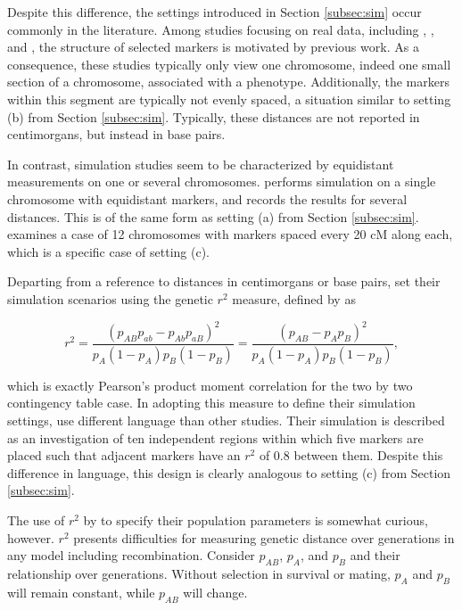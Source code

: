 \documentclass{article}
\begin{document}
Despite this difference, the settings introduced in Section \ref{subsec:sim} occur commonly in the literature. Among studies focusing on real data, including \cite{Galwey2009}, \cite{nyholt2004}, and \cite{Salyakina2005}, the structure of selected markers is motivated by previous work. As a consequence, these studies typically only view one chromosome, indeed one small section of a chromosome, associated with a phenotype. Additionally, the markers within this segment are typically not evenly spaced, a situation similar to setting (b) from Section \ref{subsec:sim}. Typically, these distances are not reported in centimorgans, but instead in base pairs.

In contrast, simulation studies seem to be characterized by equidistant measurements on one or several chromosomes. \cite{cheverud2001} performs simulation on a single chromosome with equidistant markers, and records the results for several distances. This is of the same form as setting (a) from Section \ref{subsec:sim}. \cite{LanderBotstein1989} examines a case of 12 chromosomes with markers spaced every 20 cM along each, which is a specific case of setting (c).

Departing from a reference to distances in centimorgans or base pairs, \cite{LiJi2005} set their simulation scenarios using the genetic $r^2$ measure, defined by \cite{hillrobertson1968} as

\begin{equation} \label{eq:rsq}
  r^2 = \frac{\left ( p_{AB} p_{ab} - p_{Ab} p_{aB} \right )^2}{{p_A (1 - p_A) p_B (1 - p_B)}} = \frac{\left ( p_{AB} - p_A p_B \right )^2}{p_A (1 - p_A) p_B (1 - p_B)},
\end{equation}

\noindent which is exactly Pearson's product moment correlation for the two by two contingency table case. In adopting this measure to define their simulation settings, \cite{LiJi2005} use different language than other studies. Their simulation is described as an investigation of ten independent regions within which five markers are placed such that adjacent markers have an $r^2$ of 0.8 between them. Despite this difference in language, this design is clearly analogous to setting (c) from Section \ref{subsec:sim}.

The use of $r^2$ by \cite{LiJi2005} to specify their population parameters is somewhat curious, however. $r^2$ presents difficulties for measuring genetic distance over generations in any model including recombination. Consider $p_{AB}$, $p_A$, and $p_B$ and their relationship over generations. Without selection in survival or mating, $p_A$ and $p_B$ will remain constant, while $p_{AB}$ will change.
\end{document}
